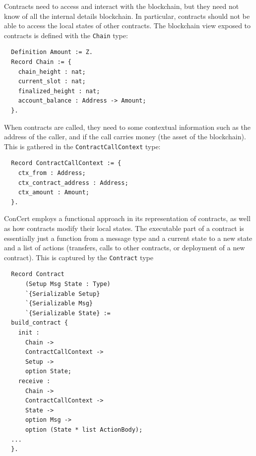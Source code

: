 \documentclass[twoside,11pt,openright]{report}
\newenvironment{code}{\captionsetup{type=figure, singlelinecheck=off, justification=raggedleft}}{}
\newcommand{\cc}{ConCert}
\newcommand{\coq}[1]{\texttt{#1}}
\begin{document}
Contracts need to access and interact with the blockchain, but they need not know of all the internal details blockchain. In particular, contracts should not be able to access the local states of other contracts. The blockchain view exposed to contracts is defined with the \coq{Chain} type:
\begin{code}
\label{def:Amount}
\begin{verbatim}
  Definition Amount := Z.
  Record Chain := {
    chain_height : nat;
    current_slot : nat;
    finalized_height : nat;
    account_balance : Address -> Amount;
  }.
\end{verbatim}
\end{code}
When contracts are called, they need to some contextual information such as the address of the caller, and if the call carries money (the asset of the blockchain). This is gathered in the \coq{ContractCallContext} type:
\begin{code}
\label{def:ContractCallContext}
\begin{verbatim}
  Record ContractCallContext := {
    ctx_from : Address;
    ctx_contract_address : Address;
    ctx_amount : Amount;
  }.
\end{verbatim}
\end{code}
\cc{} employs a functional approach in its representation of contracts, as well as how contracts modify their local states. The executable part of a contract is essentially just a function from a message type and a current state to a new state and a list of actions (transfers, calls to other contracts, or deployment of a new contract). This is captured by the \coq{Contract} type 
\begin{code}
\label{def:Contract}
\begin{verbatim}
  Record Contract
      (Setup Msg State : Type)
      `{Serializable Setup}
      `{Serializable Msg}
      `{Serializable State} :=
  build_contract {
    init :
      Chain ->
      ContractCallContext ->
      Setup ->
      option State;
    receive :
      Chain ->
      ContractCallContext ->
      State ->
      option Msg ->
      option (State * list ActionBody);
  ...
  }.
\end{verbatim}
\end{code}
\end{document}
